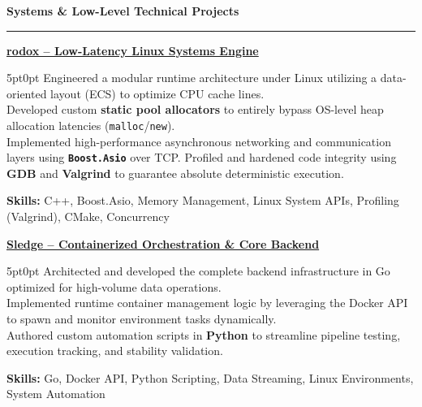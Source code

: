 \documentclass[9pt]{extarticle}
\begin{document}
\par\vspace{5pt}

{\large\bfseries Systems \& Low-Level Technical Projects}
\par\vspace{-8pt}
\rule{\linewidth}{0.4pt}
\par\vspace{5pt}

\underline{\bfseries rodox -- Low-Latency Linux Systems Engine}
\par
\begin{adjustwidth}{5pt}{0pt}
    Engineered a modular runtime architecture under Linux utilizing a data-oriented layout (ECS) to optimize CPU cache lines. \\
    Developed custom {\bfseries static pool allocators} to entirely bypass OS-level heap allocation latencies (\texttt{malloc}/\texttt{new}). \\
    Implemented high-performance asynchronous networking and communication layers using {\bfseries \texttt{Boost.Asio}} over TCP.
    Profiled and hardened code integrity using {\bfseries GDB} and {\bfseries Valgrind} to guarantee absolute deterministic execution.
\end{adjustwidth}
\par
{\bfseries Skills:} C++, Boost.Asio, Memory Management, Linux System APIs, Profiling (Valgrind), CMake, Concurrency

\par\vspace{8pt}

\underline{\bfseries Sledge -- Containerized Orchestration \& Core Backend}
\par
\begin{adjustwidth}{5pt}{0pt}
    Architected and developed the complete backend infrastructure in Go optimized for high-volume data operations. \\
    Implemented runtime container management logic by leveraging the Docker API to spawn and monitor environment tasks dynamically. \\
    Authored custom automation scripts in {\bfseries Python} to streamline pipeline testing, execution tracking, and stability validation.
\end{adjustwidth}
\par
{\bfseries Skills:} Go, Docker API, Python Scripting, Data Streaming, Linux Environments, System Automation

\par\vspace{8pt}
\end{document}
